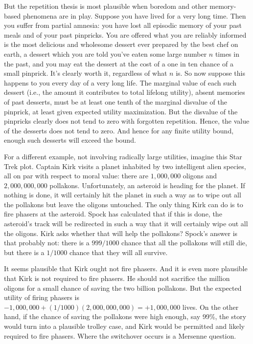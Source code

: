 But the repetition thesis is most plausible when boredom and other memory-based phenomena are in play. Suppose you have 
lived for a very long time. Then you suffer from partial amnesia: you have
lost all episodic memory of your past meals and of your past pinpricks. You are offered what you are reliably informed is 
the most delicious and wholesome dessert ever prepared by the best chef on earth, a dessert  which you are told you've eaten some large 
number $n$ times in the past, and you may eat the dessert at the cost of a one in ten chance of a small pinprick. It's clearly worth it,
regardless of what $n$ is. So now suppose this happens to you every day of a very long life. The marginal value of each such 
dessert (i.e., the amount it contributes to total lifelong utility), absent memories of past desserts, must  be at least one 
tenth of the marginal disvalue of the pinprick, at least given expected  utility maximization. But the disvalue of the pinpricks 
clearly does not tend to zero with forgotten repetition. Hence, the value of the desserts does not tend to zero. And hence for any
finite utility bound, enough such desserts will exceed the bound.

For a different example, not involving radically large utilities, imagine this Star Trek plot. Captain Kirk visits a planet inhabited
by two intelligent alien species, all on par with respect to moral value: there are $1,000,000$ oligons and 
$2,000,000,000$ pollakons. Unfortunately, an asteroid is heading for the planet. If nothing is done, it will certainly hit the planet in such
a way as to wipe out all the pollakons but leave the oligons untouched. The only thing Kirk can do is to fire phasers at the asteroid. Spock has calculated that if this
is done, the asteroid's track will be redirected in such a way that it will certainly wipe out all the oligons. Kirk asks whether that will help 
the pollakons? Spock's answer is that probably not: there is a $999/1000$ chance that all the pollakons will still die, but there is
a $1/1000$ chance that they will all survive. 

It seems plausible that Kirk ought not fire phasers. And it is even more plausible that Kirk is not required to fire phasers.
He should not sacrifice the million oligons for a small chance of saving the two billion pollakons. 
But the expected utility of firing phasers is $-1,000,000+(1/1000)(2,000,000,000)=+1,000,000$ lives.
On the other hand, if the chance of saving the pollakons were high enough, say 99\%, the story would turn into 
a plausible trolley case, and Kirk would be permitted and likely required to fire phasers. Where the switchover
occurs is a Mersenne question.

